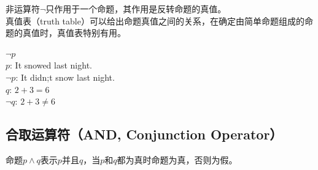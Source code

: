 \documentclass[12pt, openany, oneside]{book}
\begin{document}
非运算符$ \neg $只作用于一个命题，其作用是反转命题的真值。\\

真值表（truth table）可以给出命题真值之间的关系，在确定由简单命题组成的命题的真值时，真值表特别有用。

\begin{table}[H]
	\centering
	\caption{NOT真值表}
\end{table}

\begin{tcolorbox}
	$ \neg p $\\
	$ p $: It snowed last night.\\
	$ \neg p $: It didn;t snow last night.\\
	$ q $: $ 2 + 3 = 6 $\\
	$ \neg q $: $ 2 + 3 \ne 6 $
\end{tcolorbox}

\vspace{0.5cm}

\subsection{合取运算符（AND, Conjunction Operator）}

命题$ p \wedge q $表示$ p $并且$ q $，当$ p $和$ q $都为真时命题为真，否则为假。

\begin{table}[H]
	\centering
	\caption{AND真值表}
\end{table}
\end{document}
